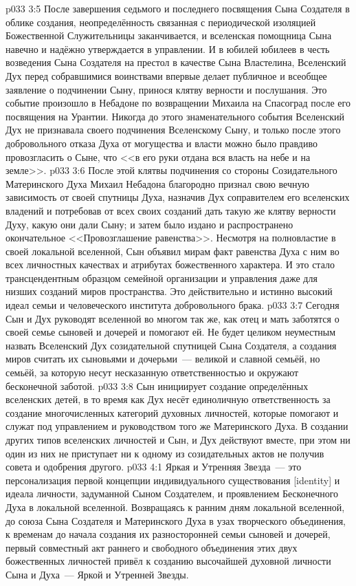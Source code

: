 \vs p033 3:5 После завершения седьмого и последнего посвящения Сына Создателя в облике создания, неопределённость связанная с периодической изоляцией Божественной Служительницы заканчивается, и вселенская помощница Сына навечно и надёжно утверждается в управлении. И в юбилей юбилеев в честь возведения Сына Создателя на престол в качестве Сына Властелина, Вселенский Дух перед собравшимися воинствами впервые делает публичное и всеобщее заявление о подчинении Сыну, принося клятву верности и послушания. Это событие произошло в Небадоне по возвращении Михаила на Спасоград после его посвящения на Урантии. Никогда до этого знаменательного события Вселенский Дух не признавала своего подчинения Вселенскому Сыну, и только после этого добровольного отказа Духа от могущества и власти можно было правдиво провозгласить о Сыне, что <<в его руки отдана вся власть на небе и на земле>>.
\vs p033 3:6 После этой клятвы подчинения со стороны Созидательного Материнского Духа Михаил Небадона благородно признал свою вечную зависимость от своей спутницы Духа, назначив Дух соправителем его вселенских владений и потребовав от всех своих созданий дать такую же клятву верности Духу, какую они дали Сыну; и затем было издано и распространено окончательное <<Провозглашение равенства>>. Несмотря на полновластие в своей локальной вселенной, Сын объявил мирам факт равенства Духа с ним во всех личностных качествах и атрибутах божественного характера. И это стало трансцендентным образцом семейной организации и управления даже для низших созданий миров пространства. Это действительно и истинно высокий идеал семьи и человеческого института добровольного брака.
\vs p033 3:7 Сегодня Сын и Дух руководят вселенной во многом так же, как отец и мать заботятся о своей семье сыновей и дочерей и помогают ей. Не будет целиком неуместным назвать Вселенский Дух созидательной спутницей Сына Создателя, а создания миров считать их сыновьями и дочерьми~--- великой и славной семьёй, но семьёй, за которую несут несказанную ответственностью и окружают бесконечной заботой.
\vs p033 3:8 \pc Сын инициирует создание определённых вселенских детей, в то время как Дух несёт единоличную ответственность за создание многочисленных категорий духовных личностей, которые помогают и служат под управлением и руководством того же Материнского Духа. В создании других типов вселенских личностей и Сын, и Дух действуют вместе, при этом ни один из них не приступает ни к одному из созидательных актов не получив совета и одобрения другого.
\vs p033 4:1 Яркая и Утренняя Звезда~--- это персонализация первой концепции индивидуального существования [identity] и идеала личности, задуманной Сыном Создателем, и проявлением Бесконечного Духа в локальной вселенной. Возвращаясь к ранним дням локальной вселенной, до союза Сына Создателя и Материнского Духа в узах творческого объединения, к временам до начала создания их разносторонней семьи сыновей и дочерей, первый совместный акт раннего и свободного объединения этих двух божественных личностей привёл к созданию высочайшей духовной личности Сына и Духа~--- Яркой и Утренней Звезды.
